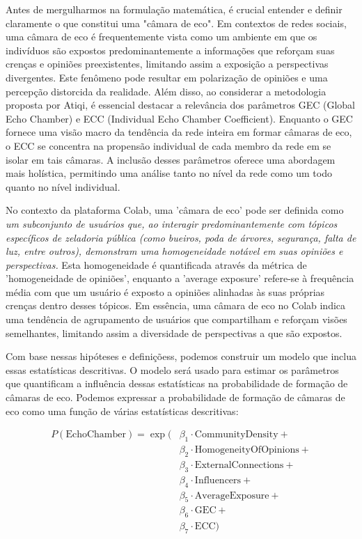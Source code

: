 Antes de mergulharmos na formulação matemática, é crucial entender e definir claramente o que constitui uma "câmara de eco". Em contextos de redes sociais, uma câmara de eco é frequentemente vista como um ambiente em que os indivíduos são expostos predominantemente a informações que reforçam suas crenças e opiniões preexistentes, limitando assim a exposição a perspectivas divergentes. Este fenômeno pode resultar em polarização de opiniões e uma percepção distorcida da realidade. Além disso, ao considerar a metodologia proposta por Atiqi, é essencial destacar a relevância dos parâmetros GEC (Global Echo Chamber) e ECC (Individual Echo Chamber Coefficient). Enquanto o GEC fornece uma visão macro da tendência da rede inteira em formar câmaras de eco, o ECC se concentra na propensão individual de cada membro da rede em se isolar em tais câmaras. A inclusão desses parâmetros oferece uma abordagem mais holística, permitindo uma análise tanto no nível da rede como um todo quanto no nível individual.

No contexto da plataforma Colab, uma 'câmara de eco' pode ser definida como \textit{um subconjunto de usuários que, ao interagir predominantemente com tópicos específicos de zeladoria pública (como bueiros, poda de árvores, segurança, falta de luz, entre outros), demonstram uma homogeneidade notável em suas opiniões e perspectivas.} Esta homogeneidade é quantificada através da métrica de 'homogeneidade de opiniões', enquanto a 'average exposure' refere-se à frequência média com que um usuário é exposto a opiniões alinhadas às suas próprias crenças dentro desses tópicos. Em essência, uma câmara de eco no Colab indica uma tendência de agrupamento de usuários que compartilham e reforçam visões semelhantes, limitando assim a diversidade de perspectivas a que são expostos.

Com base nessas hipóteses e definiçõess, podemos construir um modelo que inclua essas estatísticas descritivas. O modelo será usado para estimar os parâmetros que quantificam a influência dessas estatísticas na probabilidade de formação de câmaras de eco. Podemos expressar a probabilidade de formação de câmaras de eco como uma função de várias estatísticas descritivas:

\begin{equation}
	\begin{split}
		P(\text{{EchoChamber}}) = \exp(&\beta_1 \cdot \text{{CommunityDensity}} + \\
		&\beta_2 \cdot \text{{HomogeneityOfOpinions}} + \\
		&\beta_3 \cdot \text{{ExternalConnections}} + \\
		&\beta_4 \cdot \text{{Influencers}} + \\
		&\beta_5 \cdot \text{{AverageExposure}} + \\
		&\beta_6 \cdot \text{{GEC}} + \\
		&\beta_7 \cdot \text{{ECC}})
	\end{split}
\end{equation}

